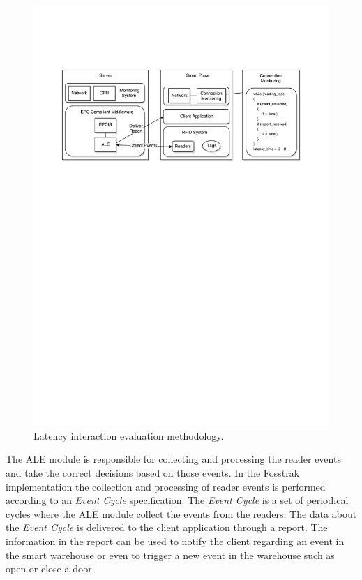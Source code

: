 \begin{figure}[ht!]
  \centering
  \includegraphics[width=.9\textwidth]{./images/eval_latency_methodology}
  \caption[Latency evaluation methodology.]{Latency interaction evaluation methodology.}
  \label{fig:eval_latency_methodology}
\end{figure}

The \gls{ALE} module is responsible for collecting and processing the reader events and take the
correct decisions based on those events. In the Fosstrak implementation the collection and processing
of reader events is performed according to an \textit{Event Cycle} specification. The \textit{Event Cycle}
is a set of periodical cycles where the \gls{ALE} module collect the events from the readers. The data
about the \textit{Event Cycle} is delivered to the client application through a report. The information
in the report can be used to notify the client regarding an event in the smart warehouse or even to
trigger a new event in the warehouse such as open or close a door.\\

